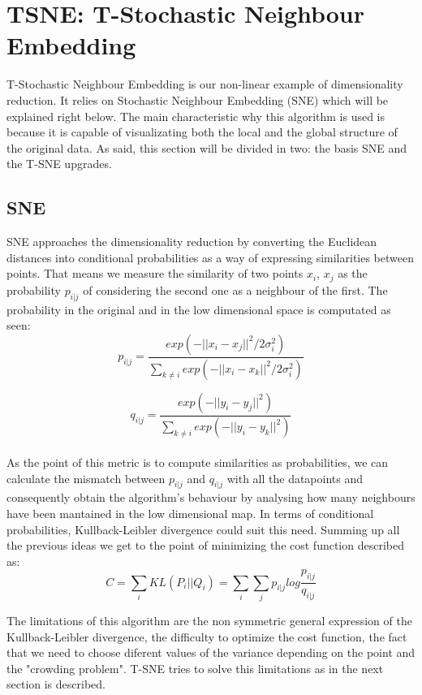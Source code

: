 \documentclass[a4paper,11pt,spanish]{report}
\begin{document}
\section{TSNE: T-Stochastic Neighbour Embedding}
\label{sec:tsne}

T-Stochastic Neighbour Embedding is our non-linear example of dimensionality reduction. It relies on Stochastic Neighbour Embedding (SNE) which will be explained right below. The main characteristic why this algorithm is used is because it is capable of visualizating both the local and the global structure of the original data. As said, this section will be divided in two: the basis SNE and the T-SNE upgrades.

\subsection{SNE}
\label{ssec:sne}

SNE approaches the dimensionality reduction by converting the Euclidean distances into conditional probabilities as a way of expressing similarities between points. That means we measure the similarity of two points $x_{i}$, $x_{j}$ as the probability $p_{i|j}$ of considering the second one as a neighbour of the first. The probability in the original and in the low dimensional space is computated as seen:\\
$$ p_{i|j} = \frac{exp(-||x_{i}-x_{j}||^{2}/2\sigma_{i}^{2})}{\sum _{k\neq i} exp (-||x_{i}-x_{k}||^{2}/2\sigma_{i}^{2})}$$

$$ q_{i|j} = \frac{exp(-||y_{i}-y_{j}||^{2})}{\sum _{k\neq i} exp (-||y_{i}-y_{k}||^{2})} $$\\
As the point of this metric is to compute similarities as probabilities, we can calculate the mismatch between $p_{i|j}$ and $q_{i|j}$ with all the datapoints and consequently obtain the algorithm's behaviour by analysing how many neighbours have been mantained in the low dimensional map. In terms of conditional probabilities, Kullback-Leibler divergence could suit this need. Summing up all the previous ideas we get to the point of minimizing the cost function described as:\\
$$ C = \sum\limits_{i} KL(P_{i}||Q_{i}) = \sum\limits_{i} \sum\limits_{j} p_{i|j} log \frac{p_{i|j}}{q_{i|j}}$$

The limitations of this algorithm are the non symmetric general expression of the Kullback-Leibler divergence, the difficulty to optimize the cost function, the fact that we need to choose diferent values of the variance depending on the point and the "crowding problem". T-SNE tries to solve this limitations as in the next section is described.
\newpage
\end{document}
